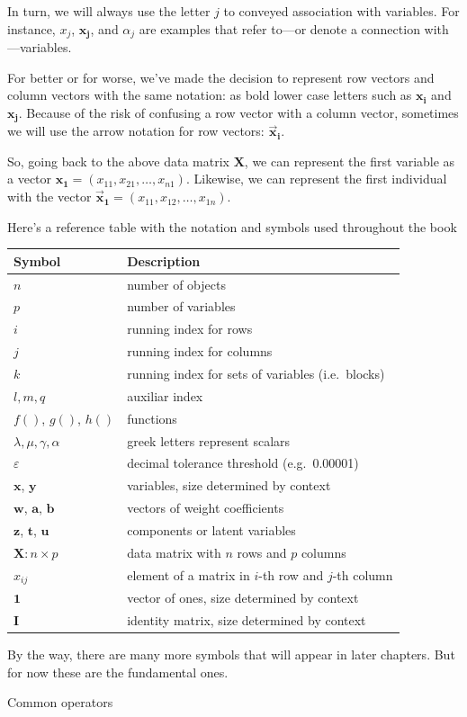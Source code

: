 \documentclass[]{book}
\begin{document}
In turn, we will always use the letter \(j\) to conveyed association with variables.
For instance, \(x_j\), \(\mathbf{x_j}\), and \(\alpha_j\) are examples that refer
to---or denote a connection with---variables.

For better or for worse, we've made the decision to represent row vectors and column
vectors with the same notation: as bold lower case letters such as \(\mathbf{x_i}\) and
\(\mathbf{x_j}\). Because of the risk of confusing a row vector with a column vector,
sometimes we will use the arrow notation for row vectors: \(\mathbf{\vec{x}_i}\).

So, going back to the above data matrix \(\mathbf{X}\), we can represent the first
variable as a vector \(\mathbf{x_1} = (x_{11}, x_{21}, \dots, x_{n1})\).
Likewise, we can represent the first individual with the vector
\(\mathbf{\vec{x}_1} = (x_{11}, x_{12}, \dots, x_{1n})\).

Here's a reference table with the notation and symbols used throughout the book

\begin{longtable}[]{@{}ll@{}}
\toprule
Symbol & Description\tabularnewline
\midrule
\endhead
\(n\) & number of objects\tabularnewline
\(p\) & number of variables\tabularnewline
\(i\) & running index for rows\tabularnewline
\(j\) & running index for columns\tabularnewline
\(k\) & running index for sets of variables (i.e.~blocks)\tabularnewline
\(l, m, q\) & auxiliar index\tabularnewline
\(f()\), \(g()\), \(h()\) & functions\tabularnewline
\(\lambda, \mu, \gamma, \alpha\) & greek letters represent scalars\tabularnewline
\(\varepsilon\) & decimal tolerance threshold (e.g.~0.00001)\tabularnewline
\(\mathbf{x}\), \(\mathbf{y}\) & variables, size determined by context\tabularnewline
\(\mathbf{w}\), \(\mathbf{a}\), \(\mathbf{b}\) & vectors of weight coefficients\tabularnewline
\(\mathbf{z}\), \(\mathbf{t}\), \(\mathbf{u}\) & components or latent variables\tabularnewline
\(\mathbf{X} : n \times p\) & data matrix with \(n\) rows and \(p\) columns\tabularnewline
\(x_{ij}\) & element of a matrix in \(i\)-th row and \(j\)-th column\tabularnewline
\(\mathbf{1}\) & vector of ones, size determined by context\tabularnewline
\(\mathbf{I}\) & identity matrix, size determined by context\tabularnewline
\bottomrule
\end{longtable}

By the way, there are many more symbols that will appear in later chapters.
But for now these are the fundamental ones.

Common operators
\end{document}
